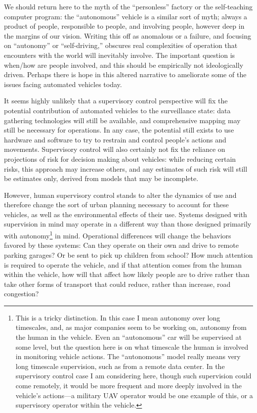We should return here to the myth of the ``personless'' factory or the
self-teaching computer program: the ``autonomous'' vehicle is a
similar sort of myth; always a 
product of people, responsible to people, and involving people,
however deep in the margins of our vision. Writing this off as
anomalous or a failure, and focusing on ``autonomy'' or ``self-driving,''
obscures real complexities of operation that encounters with the world
will inevitably involve. The important question is when/how are people
involved, and this should be empirically not ideologically driven.
Perhaps there is hope in this altered narrative to ameliorate some of
the issues facing automated vehicles today. 

It seems highly unlikely that a supervisory control perspective will
fix the potential contribution of automated vehicles to the
surveillance state:  data gathering technologies will still be
available, and comprehensive mapping may still be necessary for
operations. In any case, the potential still exists to use hardware
and software to try to restrain and control people's actions and
movements. Supervisory control will also certainly not fix the
reliance on projections of risk for decision making about vehicles:
while reducing certain risks, this approach may increase others, and
any estimates of such risk will still be estimates only, derived from
models that may be incomplete.

However, human supervisory control stands to alter the dynamics of use
and therefore change the sort of urban planning necessary to account
for these vehicles, as well as the environmental effects of their use.
Systems designed with supervision in mind may operate in a different
way than those designed primarily with autonomy\footnote{This is a
  tricky distinction. In this case
  I mean autonomy over long timescales, and, as major companies seem
  to be working on, autonomy from the human in the vehicle. Even an
  ``autonomous'' car will be supervised at some level, but the
  question here is on what timescale the human is involved in
  monitoring vehicle actions. The ``autonomous'' model really means very
  long timescale supervision, such as from a remote data center. In
  the supervisory control case I am considering here, though such
  supervision could come remotely, it would be more frequent and more
  deeply involved in the vehicle's actions---a military UAV operator
  would be one example of this, or a supervisory operator within the
  vehicle.} in mind. Operational
differences will change the behaviors favored by these systems:  Can
they operate on their own and drive to remote parking garages? Or be
sent to pick up children from school? How much attention is required
to operate the vehicle, and if that attention comes from the human
within the vehicle, how will that affect how likely people are to
drive rather than take other forms of transport that could reduce,
rather than increase, road congestion? 

